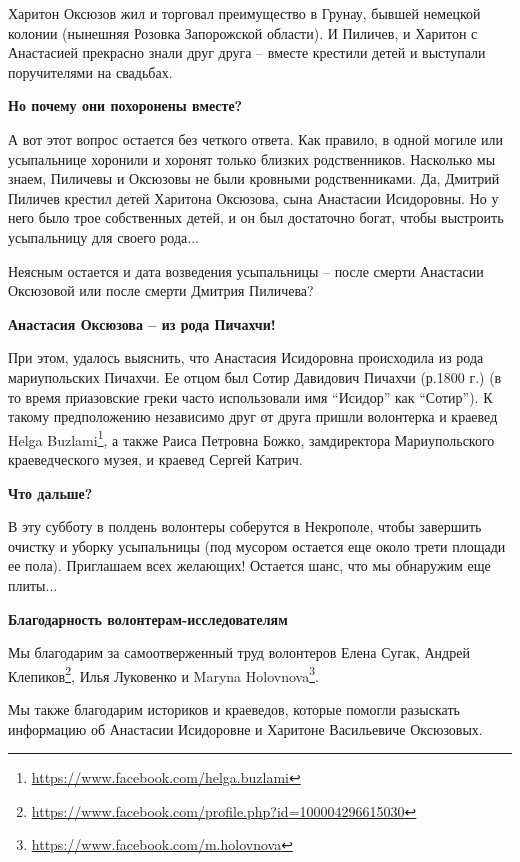 Харитон Оксюзов жил и торговал преимущество в Грунау, бывшей немецкой колонии
(нынешняя Розовка Запорожской области). И Пиличев, и Харитон с Анастасией
прекрасно знали друг друга – вместе крестили детей и выступали поручителями на
свадьбах.

\textbf{Но почему они похоронены вместе?}

А вот этот вопрос остается без четкого ответа. Как правило, в одной могиле или
усыпальнице хоронили и хоронят только близких родственников. Насколько мы
знаем, Пиличевы и Оксюзовы не были кровными родственниками. Да, Дмитрий Пиличев
крестил детей Харитона Оксюзова, сына Анастасии Исидоровны. Но у него было трое
собственных детей, и он был достаточно богат, чтобы выстроить усыпальницу для
своего рода...

Неясным остается и дата возведения усыпальницы – после смерти Анастасии
Оксюзовой или после смерти Дмитрия Пиличева?

\textbf{Анастасия Оксюзова – из рода Пичахчи!}

При этом, удалось выяснить, что Анастасия Исидоровна происходила из рода
мариупольских Пичахчи. Ее отцом был Сотир Давидович Пичахчи (р.1800 г.) (в то
время приазовские греки часто использовали имя \enquote{Исидор} как
\enquote{Сотир}). К такому предположению независимо друг от друга пришли
волонтерка и краевед Helga Buzlami\footnote{\url{https://www.facebook.com/helga.buzlami}}, а также Раиса Петровна Божко, замдиректора
Мариупольского краеведческого музея, и краевед Сергей Катрич.

\textbf{Что дальше?}

В эту субботу в полдень волонтеры соберутся в Некрополе, чтобы завершить
очистку и уборку усыпальницы (под мусором остается еще около трети площади ее
пола). Приглашаем всех желающих! Остается шанс, что мы обнаружим еще плиты...

\textbf{Благодарность волонтерам-исследователям}

Мы благодарим за самоотверженный труд волонтеров Елена Сугак, Андрей Клепиков\footnote{\url{https://www.facebook.com/profile.php?id=100004296615030}},
Илья Луковенко и Maryna Holovnova\footnote{\url{https://www.facebook.com/m.holovnova}}.

Мы также благодарим историков и краеведов, которые помогли разыскать информацию
об Анастасии Исидоровне и Харитоне Васильевиче Оксюзовых.
